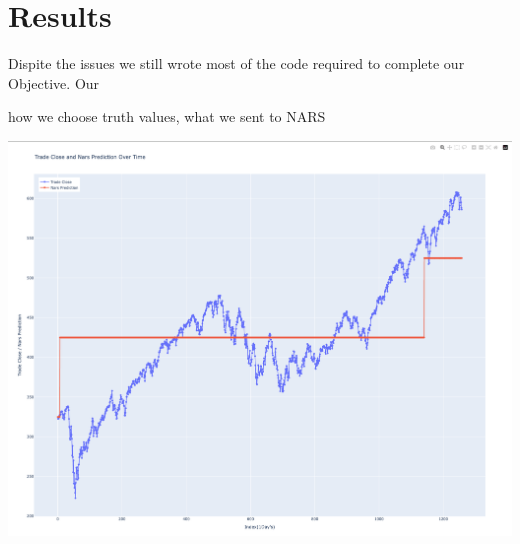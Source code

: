 \documentclass{article}
\begin{document}
\section{Results}
Dispite the issues we still wrote most of the code required to complete our Objective. Our

how we choose truth values, what we sent to NARS

\begin{center}
	\includegraphics[width=\textwidth]{screenshot.png}
\end{center}
\end{document}
